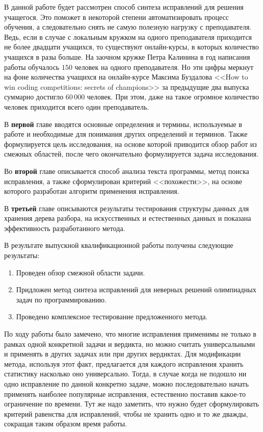 \documentclass[times,specification,annotation]{itmo-student-thesis}
\begin{document}
В данной работе будет рассмотрен способ синтеза исправлений для решения учащегося. Это поможет в некоторой
степени автоматизировать процесс обучения, а следовательно снять не самую полезную нагрузку с преподавателя.
Ведь, если в случае с локальным кружком на одного преподавателя приходится не более двадцати учащихся, то существуют
онлайн-курсы, в которых количество учащихся в разы больше. На заочном кружке Петра Калинина в год написания работы
обучалось $150$ человек на одного преподавателя. Но эти цифры меркнут на фоне количества учащихся на онлайн-курсе 
Максима Буздалова <<How to win coding competitions: secrets of champions>> за предыдущие два выпуска суммарно достигло 
$60\,000$ человек. При этом, даже на такое огромное количество человек приходится всего один преподаватель.

В \textbf{первой} главе вводятся основные определения и термины, используемые в работе и необходимые
для понимания других определений и терминов. Также формулируется цель исследования, на основе которой
приводится обзор работ из смежных областей, после чего окончательно формулируется задача исследования.

Во \textbf{второй} главе описывается способ анализа текста программы, метод поиска исправления, а также
сформулирован критерий <<похожести>>, на основе которого разработан алгоритм применения исправления.

В \textbf{третьей} главе описываются результаты тестирования структуры данных для хранения дерева разбора,
на искусственных и естественных данных и показана эффективность разработанного метода.






\startconclusionpage

В результате выпускной квалификационной работы получены следующие результаты:
\begin{enumerate}
    \item Проведен обзор смежной области задачи.
    \item Придложен метод синтеза исправлений для неверных решений олимпиадных задач по программированию.
    \item Проведено комплексное тестирование предложенного метода.
\end{enumerate}

По ходу работы было замечено, что многие исправления применимы не только в рамках одной конкретной задачи и вердикта,
но можно считать универсальными и применять в других задачах или при других вердиктах. Для модификации метода, используя
этот факт, предлагается для каждого исправления хранить статистику насколько оно универсально. Тогда, в случае когда
не подошло ни одно исправление по данной конкретно задаче, можно последовательно начать применять наиболее популярные исправления,
естественно поставив какое-то ограничение по времени. Тут же надо заметить, что нужно будет сформулировать критерий равенства
для исправлений, чтобы не хранить одно и то же дважды, сокращая таким образом время работы. 
\end{document}
